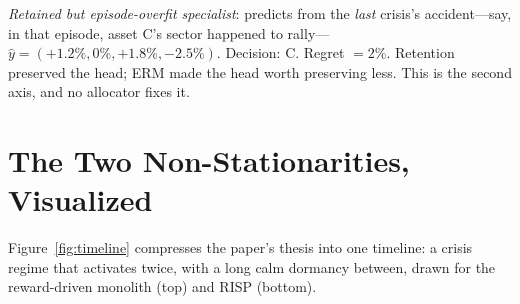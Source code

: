 \documentclass[10pt]{article}
\newcommand{\nm}{\textsc{RISP}}
\begin{document}
\emph{Retained but episode-overfit specialist}: predicts from the
\emph{last} crisis's accident---say, in that episode, asset C's sector
happened to rally---$\hat y = (+1.2\%, 0\%, +1.8\%, -2.5\%)$. Decision:
C. Regret $= 2\%$. Retention preserved the head; ERM made the head worth
preserving less. This is the second axis, and no allocator fixes it.

\section{The Two Non-Stationarities, Visualized}
\label{sec:timeline}

Figure~\ref{fig:timeline} compresses the paper's thesis into one
timeline: a crisis regime that activates twice, with a long calm dormancy
between, drawn for the reward-driven monolith (top) and \nm{} (bottom).
\end{document}

